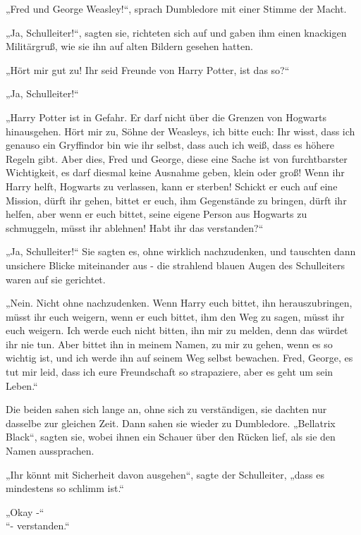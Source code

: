 {„Fred und George Weasley!“, sprach Dumbledore mit einer Stimme der Macht.

„Ja, Schulleiter!“, sagten sie, richteten sich auf und gaben ihm einen knackigen Militärgruß, wie sie ihn auf alten Bildern gesehen hatten.

„Hört mir gut zu! Ihr seid Freunde von Harry Potter, ist das so?“

„Ja, Schulleiter!“

„Harry Potter ist in Gefahr. Er darf nicht über die Grenzen von Hogwarts hinausgehen. Hört mir zu, Söhne der Weasleys, ich bitte euch: Ihr wisst, dass ich genauso ein Gryffindor bin wie ihr selbst, dass auch ich weiß, dass es höhere Regeln gibt. Aber dies, Fred und George, diese eine Sache ist von furchtbarster Wichtigkeit, es darf diesmal keine Ausnahme geben, klein oder groß! Wenn ihr Harry helft, Hogwarts zu verlassen, kann er sterben! Schickt er euch auf eine Mission, dürft ihr gehen, bittet er euch, ihm Gegenstände zu bringen, dürft ihr helfen, aber wenn er euch bittet, seine eigene Person aus Hogwarts zu schmuggeln, müsst ihr ablehnen! Habt ihr das verstanden?“

„Ja, Schulleiter!“ Sie sagten es, ohne wirklich nachzudenken, und tauschten dann unsichere Blicke miteinander aus - die strahlend blauen Augen des Schulleiters waren auf sie gerichtet.

„Nein. Nicht ohne nachzudenken. Wenn Harry euch bittet, ihn herauszubringen, müsst ihr euch weigern, wenn er euch bittet, ihm den Weg zu sagen, müsst ihr euch weigern. Ich werde euch nicht bitten, ihn mir zu melden, denn das würdet ihr nie tun. Aber bittet ihn in meinem Namen, zu mir zu gehen, wenn es so wichtig ist, und ich werde ihn auf seinem Weg selbst bewachen. Fred, George, es tut mir leid, dass ich eure Freundschaft so strapaziere, aber es geht um sein Leben.“

Die beiden sahen sich lange an, ohne sich zu verständigen, sie dachten nur dasselbe zur gleichen Zeit. Dann sahen sie wieder zu Dumbledore. „Bellatrix Black“, sagten sie, wobei ihnen ein Schauer über den Rücken lief, als sie den Namen aussprachen.

„Ihr könnt mit Sicherheit davon ausgehen“, sagte der Schulleiter, „dass es mindestens so schlimm ist.“

„Okay -“\\ “- verstanden.“

}
